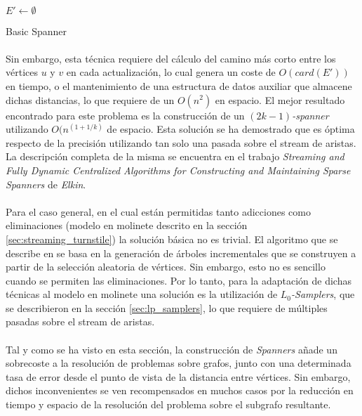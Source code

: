\documentclass{subfiles}
\begin{document}
        \paragraph{}
        \begin{algorithm}
          \SetAlgoLined
          $E' \gets \emptyset$\;
          \caption{Basic Spanner}
          \label{code:basic_spanner}
        \end{algorithm}

        \paragraph{}
        Sin embargo, esta técnica requiere del cálculo del camino más corto entre los vértices $u$ y $v$ en cada actualización, lo cual genera un coste de $O(card(E'))$ en tiempo, o el mantenimiento de una estructura de datos auxiliar que almacene dichas distancias, lo que requiere de un $O(n^2)$ en espacio. El mejor resultado encontrado para este problema es la construcción de un \emph{$(2k-1)$-spanner} utilizando $O(n^(1+1/k)$ de espacio. Esta solución se ha demostrado que es óptima respecto de la precisión utilizando tan solo una pasada sobre el stream de aristas. La descripción completa de la misma se encuentra en el trabajo \emph{Streaming and Fully Dynamic Centralized Algorithms for Constructing and Maintaining Sparse Spanners} \cite{elkin2007streaming} de \emph{Elkin}.

        \paragraph{}
        Para el caso general, en el cual están permitidas tanto adicciones como eliminaciones (modelo en molinete descrito en la sección \ref{sec:streaming_turnstile}) la solución básica no es trivial. El algoritmo que se describe en \cite{elkin2007streaming} se basa en la generación de árboles incrementales que se construyen a partir de la selección aleatoria de vértices. Sin embargo, esto no es sencillo cuando se permiten las eliminaciones. Por lo tanto, para la adaptación de dichas técnicas al modelo en molinete una solución es la utilización de \emph{$L_0$-Samplers}, que se describieron en la sección \ref{sec:lp_samplers}, lo que requiere de múltiples pasadas sobre el stream de aristas.

        \paragraph{}
        Tal y como se ha visto en esta sección, la construcción de \emph{Spanners} añade un sobrecoste a la resolución de problemas sobre grafos, junto con una determinada tasa de error desde el punto de vista de la distancia entre vértices. Sin embargo, dichos inconvenientes se ven recompensados en muchos casos por la reducción en tiempo y espacio de la resolución del problema sobre el subgrafo resultante.
\end{document}

